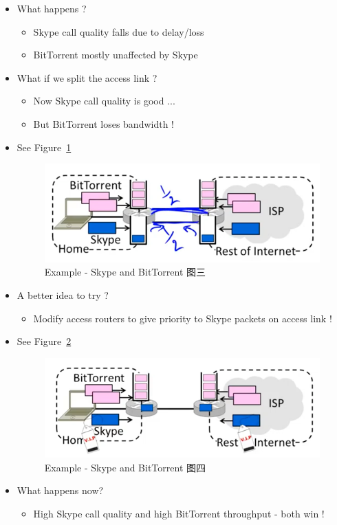 \documentclass[12pt]{ctexart}   %
\begin{document}
\begin{itemize}
		 \item What happens ?
		 \begin{itemize}
		 	\item Skype call quality falls due to delay/loss
		 	\item BitTorrent mostly unaffected by Skype
		 \end{itemize}
		 
		 \item What if we split the access link ?
		 \begin{itemize}
		 	\item Now Skype call quality is good ...
		 	\item But BitTorrent loses bandwidth !
		 \end{itemize}
		 \item See Figure~\ref{fig:9-1-5}
		  
		 \begin{figure}[h!] %
		\centering
		 \includegraphics[scale=0.7]{images/9-1-5}
		\caption{ Example - Skype and BitTorrent 图三 }
		 \label{fig:9-1-5}
		 \end{figure}
		 
		 \item A better idea to try ?
		 \begin{itemize}
		 	\item Modify access routers to give priority to Skype packets on access link !
		 \end{itemize}
		 \item See Figure~\ref{fig:9-1-6}
		  
		 \begin{figure}[h!] %
		\centering
		 \includegraphics[scale=0.7]{images/9-1-6}
		\caption{ Example - Skype and BitTorrent 图四 }
		 \label{fig:9-1-6}
		 \end{figure}
		 
		 \item What happens now?
		 \begin{itemize}
		 	\item High Skype call quality and high BitTorrent throughput - both win !
		 \end{itemize}

	\end{itemize}
	
\end{document}
